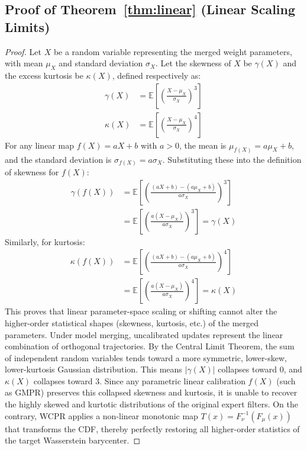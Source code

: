 \documentclass{article}
\theoremstyle{plain}
\theoremstyle{definition}
\theoremstyle{remark}
\begin{document}
\subsection{Proof of Theorem~\ref{thm:linear} (Linear Scaling Limits)}
\label{app:proof_linear}
\begin{proof}
  Let $X$ be a random variable representing the merged weight parameters, with mean $\mu_X$ and standard deviation $\sigma_X$. Let the skewness of $X$ be $\gamma(X)$ and the excess kurtosis be $\kappa(X)$, defined respectively as:
  \begin{align}
    \gamma(X) &= \mathbb{E}\left[ \left( \frac{X - \mu_X}{\sigma_X} \right)^3 \right] \\
    \kappa(X) &= \mathbb{E}\left[ \left( \frac{X - \mu_X}{\sigma_X} \right)^4 \right]
  \end{align}
  For any linear map $f(X) = a X + b$ with $a > 0$, the mean is $\mu_{f(X)} = a \mu_X + b$, and the standard deviation is $\sigma_{f(X)} = a \sigma_X$. Substituting these into the definition of skewness for $f(X)$:
  \begin{align}
    \gamma(f(X)) &= \mathbb{E}\left[ \left( \frac{(a X + b) - (a \mu_X + b)}{a \sigma_X} \right)^3 \right] \nonumber \\
    &= \mathbb{E}\left[ \left( \frac{a(X - \mu_X)}{a \sigma_X} \right)^3 \right] = \gamma(X)
  \end{align}
  Similarly, for kurtosis:
  \begin{align}
    \kappa(f(X)) &= \mathbb{E}\left[ \left( \frac{(a X + b) - (a \mu_X + b)}{a \sigma_X} \right)^4 \right] \nonumber \\
    &= \mathbb{E}\left[ \left( \frac{a(X - \mu_X)}{a \sigma_X} \right)^4 \right] = \kappa(X)
  \end{align}
  This proves that linear parameter-space scaling or shifting cannot alter the higher-order statistical shapes (skewness, kurtosis, etc.) of the merged parameters. Under model merging, uncalibrated updates represent the linear combination of orthogonal trajectories. By the Central Limit Theorem, the sum of independent random variables tends toward a more symmetric, lower-skew, lower-kurtosis Gaussian distribution. This means $|\gamma(X)|$ collapses toward 0, and $\kappa(X)$ collapses toward 3. Since any parametric linear calibration $f(X)$ (such as GMPR) preserves this collapsed skewness and kurtosis, it is unable to recover the highly skewed and kurtotic distributions of the original expert filters. On the contrary, WCPR applies a non-linear monotonic map $T(x) = F_{\nu}^{-1}(F_{\mu}(x))$ that transforms the CDF, thereby perfectly restoring all higher-order statistics of the target Wasserstein barycenter.
\end{proof}
\end{document}
